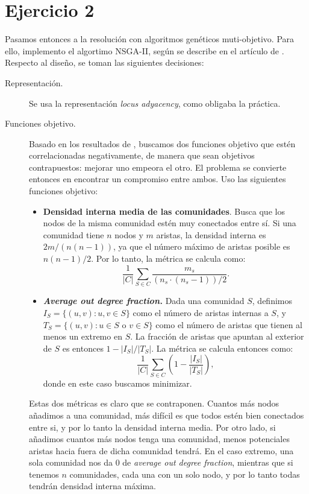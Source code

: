 \section{Ejercicio 2}\label{sec:ej2}

Pasamos entonces a la resolución con algoritmos genéticos muti-objetivo. Para
ello, implemento el algortimo NSGA-II, según se describe en el artículo de
\citeauthor{deb2002fastelitist} \cite{deb2002fastelitist}. Respecto al diseño,
se toman las siguientes decisiones:

\begin{description}
  \item[Representación.] Se usa la representación \emph{locus adyacency}, como
    obligaba la práctica.
  \item[Funciones objetivo.] Basado en los resultados de
    \citeauthor{shi2014Comparisonselection} \cite{shi2014Comparisonselection},
    buscamos dos funciones objetivo que estén correlacionadas negativamente,
    de manera que sean objetivos contrapuestos: mejorar uno empeora el otro.
    El problema se convierte entonces en encontrar un compromiso entre ambos.
    Uso las siguientes funciones objetivo:
    \begin{itemize}
      \item \textbf{Densidad interna media de las comunidades}. Busca que los nodos de
        la misma comunidad estén muy conectados entre sí. Si una comunidad tiene
        \(n\) nodos y \(m\) aristas, la densidad interna es \(2m/(n(n-1))\), ya que
        el número máximo de aristas posible es \(n(n-1)/2\). Por lo tanto, la métrica
        se calcula como:
        $$
        \frac{1}{|C|} \sum_{S \in C} \frac{m_s}{(n_s \cdot (n_s-1)) / 2}
        .$$

      \item \textbf{\emph{Average out degree fraction.}} Dada una comunidad \(S\),
        definimos \(I_S = \{ (u,v): u,v\in S \}\) como el número de aristas internas
        a \(S\), y \(T_S = \{ (u,v): u\in S \text{ o } v \in S\}\) como el número
        de aristas que tienen al menos un extremo en \(S\). La fracción de aristas
        que apuntan al exterior de \(S\) es entonces \(1 - |I_S| / |T_S|\). La métrica
        se calcula entonces como:
        $$
        \frac{1}{|C|} \sum_{S \in C} \left(1 - \frac {|I_S|} {|T_S|} \right)
        ,$$
        donde en este caso buscamos minimizar.
    \end{itemize}

    Estas dos métricas es claro que se contraponen. Cuantos más nodos añadimos a una
    comunidad, más difícil es que todos estén bien conectados entre si, y por lo tanto
    la densidad interna media. Por otro lado, si añadimos cuantos más nodos tenga una
    comunidad, menos potenciales aristas hacia fuera de dicha comunidad tendrá. En el
    caso extremo, una sola comunidad nos da \(0\) de \emph{average out degree fraction},
    mientras que si tenemos \(n\) comunidades, cada una con un solo nodo, y por lo tanto
    todas tendrán densidad interna máxima.


\end{description}
